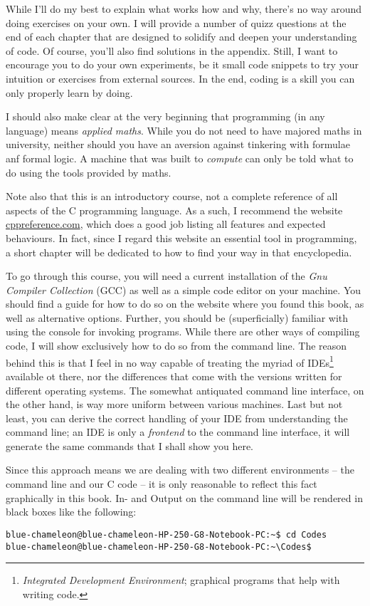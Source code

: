 While I'll do my best to explain what works how and why, there's no way around doing exercises on your own. I will provide a number of quizz questions at the end of each chapter that are designed to solidify and deepen your understanding of code. Of course, you'll also find solutions in the appendix. Still, I want to encourage you to do your own experiments, be it small code snippets to try your intuition or exercises from external sources. In the end, coding is a skill you can only properly learn by doing.

I should also make clear at the very beginning that programming (in any language) means \emph{applied maths}. While you do not need to have majored maths in university, neither should you have an aversion against tinkering with formulae anf formal logic. A machine that was built to \emph{compute} can only be told what to do using the tools provided by maths.

Note also that this is an introductory course, not a complete reference of all aspects of the C programming language. As a such, I recommend the website \url{cppreference.com}, which does a good job listing all features and expected behaviours. In fact, since I regard this website an essential tool in programming, a short chapter will be dedicated to how to find your way in that encyclopedia.

To go through this course, you will need a current installation of the \emph{Gnu Compiler Collection} (GCC) as well as a simple code editor on your machine. You should find a guide for how to do so on the website where you found this book, as well as alternative options. Further, you should be (superficially) familiar with using the console for invoking programs. While there are other ways of compiling code, I will show exclusively how to do so from the command line. The reason behind this is that I feel in no way capable of treating the myriad of IDEs\footnote{\emph{Integrated Development Environment}; graphical programs that help with writing code.} available ot there, nor the differences that come with the versions written for different operating systems. The somewhat antiquated command line interface, on the other hand, is way more uniform between various machines. Last but not least, you can derive the correct handling of your IDE from understanding the command line; an IDE is only a \emph{frontend} to the command line interface, \ie it will generate the same commands that I shall show you here.

Since this approach means we are dealing with two different environments -- the command line and our C code -- it is only reasonable to reflect this fact graphically in this book. In- and Output on the command line will be rendered in black boxes like the following:
\begin{cmdbox}
\texttt{{\color{green}blue-chameleon@blue-chameleon-HP-250-G8-Notebook-PC}:{\color{blue!80!white}\textasciitilde}\$ cd Codes} \\
\texttt{{\color{green}blue-chameleon@blue-chameleon-HP-250-G8-Notebook-PC}:{\color{blue!80!white}\textasciitilde\textbackslash Codes}\$}
\end{cmdbox}

